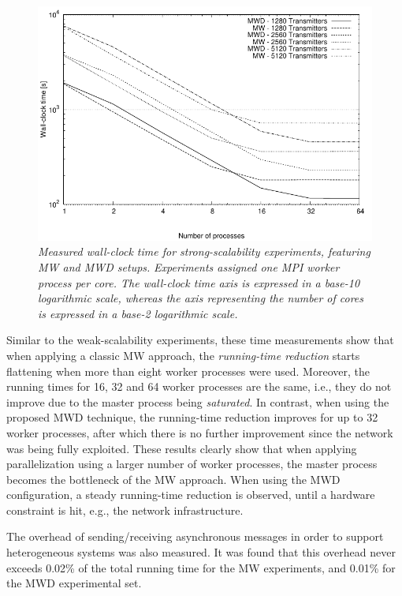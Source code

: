 \begin{figure}
\centering

\includegraphics[width=0.7\columnwidth]{04-framework_design_and_implementation/img/strong_scaling-time_plot}

\caption{\textit{\emph{Measured wall-clock time for strong-scalability experiments,
featuring MW and MWD setups.}}\textit{ }\textit{\emph{Experiments
assigned one MPI worker process per core. The wall-clock time axis
is expressed in a base-10 logarithmic scale, whereas the axis representing
the number of cores is expressed in a base-2 logarithmic scale.\label{fig:04-Strong_scalability_time}}}}
\end{figure}


Similar to the weak-scalability experiments, these time measurements
show that when applying a classic MW approach, the \textit{\emph{running-time
reduction}} starts flattening when more than eight worker processes
were used. Moreover, the running times for 16, 32 and 64 worker processes
are the same, i.e., they do not improve due to the master process
being \textit{\emph{saturated}}. In contrast, when using the proposed
MWD technique, the running-time reduction improves for up to 32 worker
processes, after which there is no further improvement since the network
was being fully exploited. These results clearly show that when applying
parallelization using a larger number of worker processes, the master
process becomes the bottleneck of the MW approach. When using the
MWD configuration, a steady running-time reduction is observed, until
a hardware constraint is hit, e.g., the network infrastructure.

The overhead of sending/receiving asynchronous messages in order to
support heterogeneous systems was also measured. It was found that
this overhead never exceeds 0.02\% of the total running time for the
MW experiments, and 0.01\% for the MWD experimental set.



